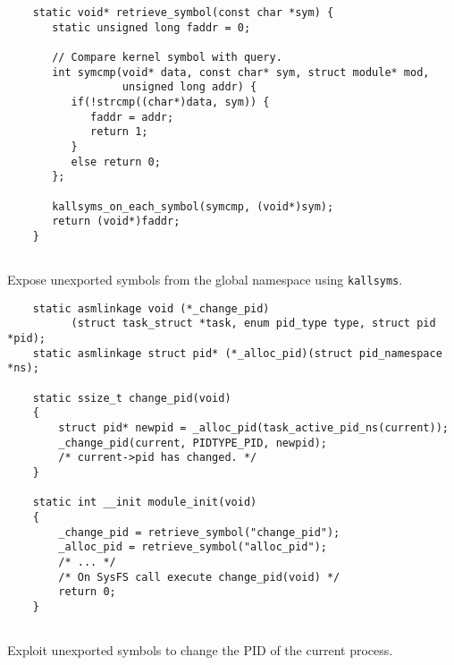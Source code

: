 \begin{listing}[h]
    \begin{verbatim}
    static void* retrieve_symbol(const char *sym) { 
       static unsigned long faddr = 0;  
    
       // Compare kernel symbol with query.
       int symcmp(void* data, const char* sym, struct module* mod, 
                  unsigned long addr) { 
          if(!strcmp((char*)data, sym)) { 
             faddr = addr; 
             return 1; 
          } 
          else return 0; 
       }; 
    
       kallsyms_on_each_symbol(symcmp, (void*)sym); 
       return (void*)faddr; 
    } 
    
    \end{verbatim}
    \caption{Expose unexported symbols from the global namespace using \texttt{kallsyms}.}
    \end{listing}
    
    \begin{listing}[h]
    \begin{verbatim}
    static asmlinkage void (*_change_pid)
          (struct task_struct *task, enum pid_type type, struct pid *pid);
    static asmlinkage struct pid* (*_alloc_pid)(struct pid_namespace *ns);
    
    static ssize_t change_pid(void)
    {
        struct pid* newpid = _alloc_pid(task_active_pid_ns(current));
        _change_pid(current, PIDTYPE_PID, newpid);
        /* current->pid has changed. */
    }
    
    static int __init module_init(void)
    {
        _change_pid = retrieve_symbol("change_pid");
        _alloc_pid = retrieve_symbol("alloc_pid");
        /* ... */
        /* On SysFS call execute change_pid(void) */
        return 0;
    }
    
    \end{verbatim}
    \caption{Exploit unexported symbols to change the PID of the current process.}
    \end{listing}